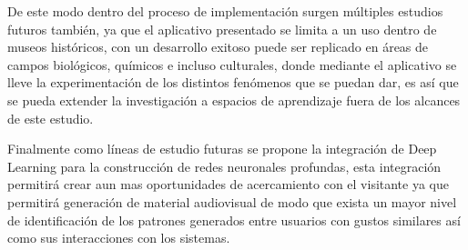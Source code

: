 \documentclass[pdflatex,sn-mathphys-num]{sn-jnl}%
\theoremstyle{thmstyleone}%
\theoremstyle{thmstyletwo}%
\theoremstyle{thmstylethree}%
\begin{document}
De este modo dentro del proceso de implementación surgen múltiples estudios futuros también, ya que el aplicativo presentado se limita a un uso dentro de museos históricos, con un desarrollo exitoso puede ser replicado en áreas de campos biológicos, químicos e incluso culturales, donde mediante el aplicativo se lleve la experimentación de los distintos fenómenos que se puedan dar, es así que se pueda extender la investigación a espacios de aprendizaje fuera de los alcances de este estudio.

Finalmente como líneas de estudio futuras se propone la integración de Deep Learning para la construcción de redes neuronales profundas, esta integración permitirá crear aun mas oportunidades de acercamiento con el visitante ya que permitirá generación de material audiovisual de modo que exista un mayor nivel de identificación de los patrones generados entre usuarios con gustos similares así como sus interacciones con los sistemas.




\end{document}
